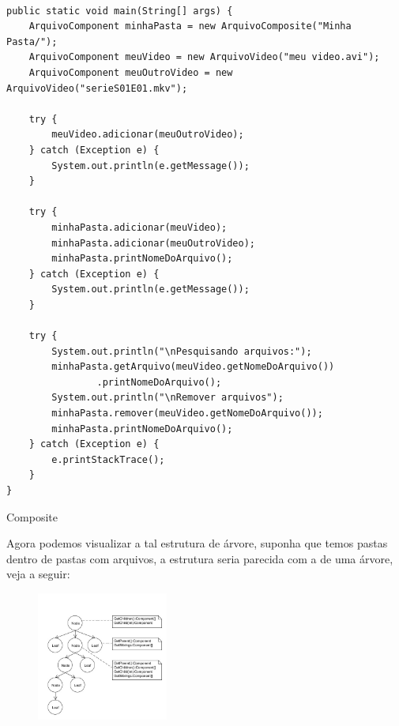 \documentclass{beamer}
\begin{document}
\begin{frame}[fragile]

\begin{lstlisting}

public static void main(String[] args) {
    ArquivoComponent minhaPasta = new ArquivoComposite("Minha Pasta/");
    ArquivoComponent meuVideo = new ArquivoVideo("meu video.avi");
    ArquivoComponent meuOutroVideo = new ArquivoVideo("serieS01E01.mkv");
 
    try {
        meuVideo.adicionar(meuOutroVideo);
    } catch (Exception e) {
        System.out.println(e.getMessage());
    }
 
    try {
        minhaPasta.adicionar(meuVideo);
        minhaPasta.adicionar(meuOutroVideo);
        minhaPasta.printNomeDoArquivo();
    } catch (Exception e) {
        System.out.println(e.getMessage());
    }
 
    try {
        System.out.println("\nPesquisando arquivos:");
        minhaPasta.getArquivo(meuVideo.getNomeDoArquivo())
                .printNomeDoArquivo();
        System.out.println("\nRemover arquivos");
        minhaPasta.remover(meuVideo.getNomeDoArquivo());
        minhaPasta.printNomeDoArquivo();
    } catch (Exception e) {
        e.printStackTrace();
    }
}

\end{lstlisting}

\end{frame}

\begin{frame}{Composite}

Agora podemos visualizar a tal estrutura de árvore, suponha que temos pastas dentro de pastas com arquivos, a estrutura seria parecida com a de uma árvore, veja a seguir:

\begin{figure}

\includegraphics[height=160px]{Composite_1.jpg}

\end{figure}

\end{frame}
\end{document}
